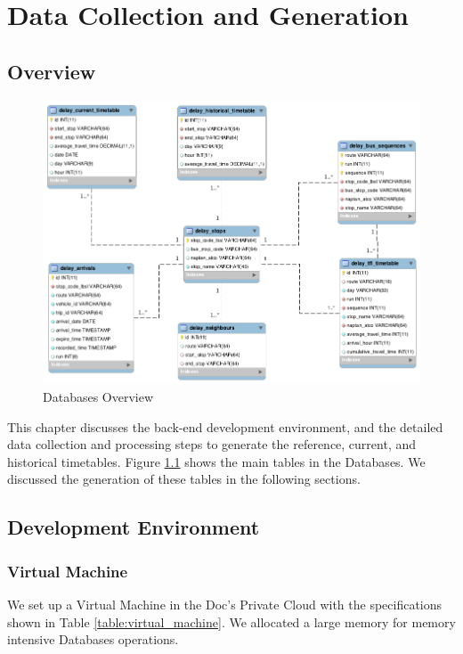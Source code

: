 \chapter{Data Collection and Generation}
\label{ch:data_generation}
\section{Overview}
\begin{figure}
\centering
\includegraphics[width=\textwidth]{figures/uml.png}
\caption{\label{fig:uml} Databases Overview}
\end{figure}

\par This chapter discusses the back-end development environment, and the detailed data collection and processing steps to generate the reference, current, and historical timetables. Figure \ref{fig:uml} shows the main tables in the Databases. We discussed the generation of these tables in the following sections.

\section{Development Environment}
\subsection{Virtual Machine}
\par We set up a Virtual Machine in the Doc's Private Cloud\cite{private_cloud} with the specifications shown in Table \ref{table:virtual_machine}. We allocated a large memory for memory intensive Databases operations.

